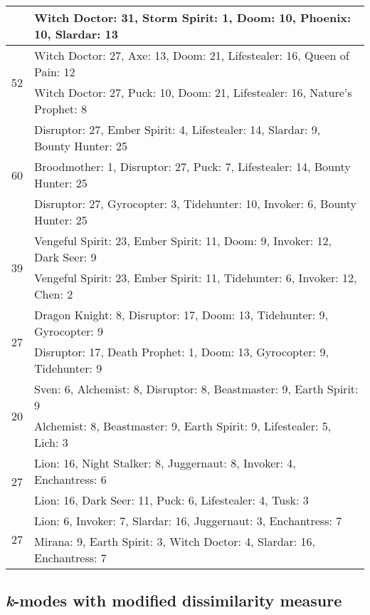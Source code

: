 \documentclass[result.tex]{subfiles}
\begin{document}
\begin{table}[H]
\begin{tabular}{ | c | p{12.5cm} | }
    & Witch Doctor: 31, Storm Spirit: 1, Doom: 10, Phoenix: 10, Slardar: 13 \\
    \hline
    \multirow{2}{*}{52}
    & Witch Doctor: 27, Axe: 13, Doom: 21, Lifestealer: 16, Queen of Pain: 12 \\
    & Witch Doctor: 27, Puck: 10, Doom: 21, Lifestealer: 16, Nature's Prophet: 8 \\
    \hline
    \multirow{3}{*}{60}
    & Disruptor: 27, Ember Spirit: 4, Lifestealer: 14, Slardar: 9, Bounty Hunter: 25 \\
    & Broodmother: 1, Disruptor: 27, Puck: 7, Lifestealer: 14, Bounty Hunter: 25 \\
    & Disruptor: 27, Gyrocopter: 3, Tidehunter: 10, Invoker: 6, Bounty Hunter: 25 \\
    \hline
    \multirow{2}{*}{39}
    & Vengeful Spirit: 23, Ember Spirit: 11, Doom: 9, Invoker: 12, Dark Seer: 9 \\
    & Vengeful Spirit: 23, Ember Spirit: 11, Tidehunter: 6, Invoker: 12, Chen: 2 \\
    \hline
    \multirow{2}{*}{27}
    & Dragon Knight: 8, Disruptor: 17, Doom: 13, Tidehunter: 9, Gyrocopter: 9 \\
    & Disruptor: 17, Death Prophet: 1, Doom: 13, Gyrocopter: 9, Tidehunter: 9 \\
    \hline
    \multirow{2}{*}{20}
    & Sven: 6, Alchemist: 8, Disruptor: 8, Beastmaster: 9, Earth Spirit: 9 \\
    & Alchemist: 8, Beastmaster: 9, Earth Spirit: 9, Lifestealer: 5, Lich: 3 \\
    \hline
    \multirow{2}{*}{27}
    & Lion: 16, Night Stalker: 8, Juggernaut: 8, Invoker: 4, Enchantress: 6 \\
    & Lion: 16, Dark Seer: 11, Puck: 6, Lifestealer: 4, Tusk: 3 \\
    \hline
    \multirow{2}{*}{27}
    & Lion: 6, Invoker: 7, Slardar: 16, Juggernaut: 3, Enchantress: 7 \\
    & Mirana: 9, Earth Spirit: 3, Witch Doctor: 4, Slardar: 16, Enchantress: 7 \\
    \hline
  \end{tabular}
  \caption{}
  \label{}
\end{table}

\newpage

\subsection*{\textit{k}-modes with modified dissimilarity measure}
\end{document}
